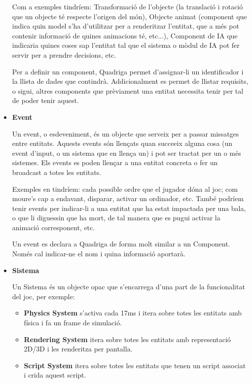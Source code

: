 \begin{itemize}
      Com a exemples tindríem: Transformació de l'objecte (la translació i rotació que un objecte té respecte l'origen del món), Objecte animat (component que indica quin model s'ha d'utilitzar per a renderitzar l'entitat, que a més pot contenir informació de quines animacions té, etc...), Component de IA que indicaria quines coses sap l'entitat tal que el sistema o mòdul de IA pot fer servir per a prendre decisions, etc.
      
      Per a definir un component, Quadriga permet d'assignar-li un identificador i la llista de dades que contindrà. Addicionalment es permet de llistar requisits, o sigui, altres components que prèviament una entitat necessita tenir per tal de poder tenir aquest.
      
    \item{\bf Event}

      Un event, o esdeveniment, és un objecte que serveix per a passar missatges entre entitats. Aquests events són llençats quan succeeix alguna cosa (un event d'input, o un sistema que en llença un) i pot ser tractat per un o més sistemes. Els events es poden llençar a una entitat concreta o fer un broadcast a totes les entitats.
      
      Exemples en tindríem: cada possible ordre que el jugador dóna al joc; com moure's cap a endavant, disparar, activar un ordinador, etc. També podríem tenir events per indicar-li a una entitat que ha estat impactada per una bala, o que li diguessin que ha mort, de tal manera que es pugui activar la animació corresponent, etc.

      Un event es declara a Quadriga de forma molt similar a un Component. Només cal indicar-ne el nom i quina informació aportarà.

    \item{\bf Sistema}

      Un Sistema és un objecte opac que s'encarrega d'una part de la funcionalitat del joc, per exemple:
      \begin{itemize}
        \item{\bf Physics System} s'activa cada 17ms i itera sobre totes les entitats amb física i fa un frame de simulació.
        \item{\bf Rendering System} itera sobre totes les entitats amb representació 2D/3D i les renderitza per pantalla.
        \item{\bf Script System} itera sobre totes les entitats que tenen un script associat i crida aquest script.
      \end{itemize}


\end{itemize}
